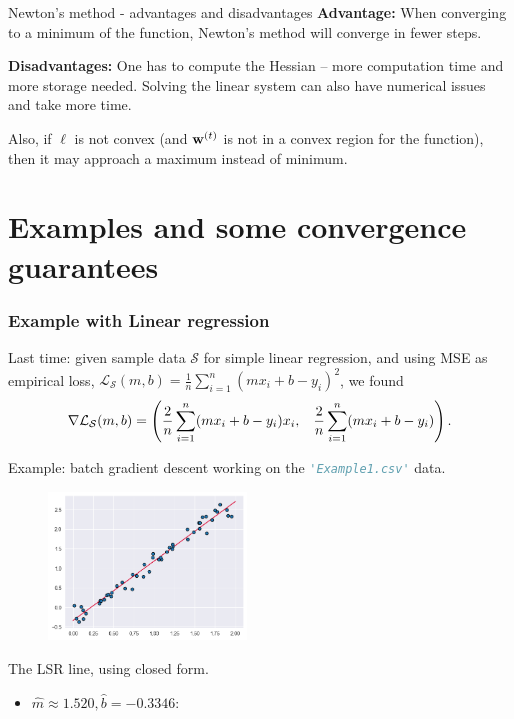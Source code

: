 \documentclass{beamer}
\theoremstyle{example}
\begin{document}
\begin{frame}{Newton's method - advantages and disadvantages}
    \textbf{Advantage:} When converging to a minimum of the function, Newton's method will converge in fewer steps.

    \textbf{Disadvantages:} One has to compute the Hessian {--} more computation time and more storage needed. Solving the linear system can also have numerical issues and take more time.

    Also, if $\ell$ is not convex (and ${\bf w}^{(t)}$ is not in a convex region for the function), then it may approach a maximum instead of minimum.

\end{frame}

\section{Examples and some convergence guarantees}
\begin{frame}
\frametitle{Example with Linear regression}
    Last time: given sample data $\mathcal S$ for simple linear regression, and using MSE as empirical loss, $\mathcal L_{\mathcal S}(m,b) = \frac1n\sum_{i=1}^n(mx_i + b - y_i)^2$, we found 
        \[\nabla\mathcal L_{\mathcal S}(m,b) = 
        {\footnotesize
        \left( \frac{2}{n}\sum_{i=1}^n(mx_i + b - y_i)x_i, \quad \frac{2}{n}\sum_{i=1}^n(mx_i + b - y_i) \right).
        }
        \]
    
    \pause
    Example: batch gradient descent working on the \lstinline[language=Python, stringstyle=\ttfamily\color{strings}]{'Example1.csv'} data.

    \begin{figure}
        \includegraphics[width=0.47\textwidth]{../../Images/example1-lsrline.png}
    \end{figure}
    \phantom{line} \newline 
    \vfill
    The LSR line, using closed form. 
    \begin{itemize}
        \item $\hat{m}\approx 1.520, \hat{b}=-0.3346$:
    \end{itemize}
    \vspace{48pt}
    \vfill
\end{frame}
\end{document}
